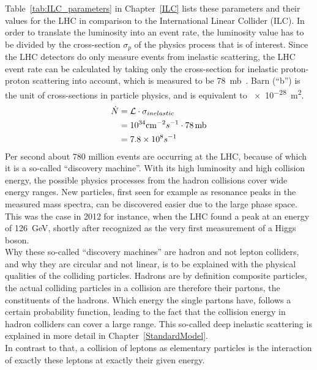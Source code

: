 Table~\ref{tab:ILC_parameters} in Chapter~\ref{ILC} lists these parameters and their values for the LHC in comparison to the International Linear Collider (ILC).
In order to translate the luminosity into an event rate, the luminosity value has to be divided by the cross-section $\sigma_p$ of the physics process that is of interest.
Since the LHC detectors do only measure events from inelastic scattering, the LHC event rate can be calculated by taking only the cross-section for inelastic proton-proton scattering into account, which is measured to be \SI{78}{\milli\barn}~\cite{inelXSection}. Barn (``b'') is the unit of cross-sections in particle physics, and is equivalent to \SI{e-28}{\meter\squared}.
\begin{align}
 \dot{N}&=\mathcal{L}\cdot\sigma_{inelastic}\\
 &=10^{34} \textrm{cm}^{-2}s^{-1} \cdot 78\textrm{\,mb}\\
 &=7.8\times 10^8 s^{-1}
\end{align}
Per second about 780 million events are occurring at the LHC, because of which it is a so-called ``discovery machine''.
With its high luminosity and high collision energy, the possible physics processes from the hadron collisions cover wide energy ranges.  
New particles, first seen for example as resonance peaks in the measured mass spectra, can be discovered easier due to the large phase space.
This was the case in 2012 for instance, when the LHC found a peak at an energy of \SI{126}{\GeV}, shortly after recognized as the very first measurement of a Higgs boson.~\cite{Higgs}\\
Why these so-called ``discovery machines'' are hadron and not lepton colliders, and why they are circular and not linear, is to be explained with the physical qualities of the colliding particles.
Hadrons are by definition composite particles, the actual colliding particles in a collision are therefore their partons, the constituents of the hadrons.
Which energy the single partons have, follows a certain probability function, leading to the fact that the collision energy in hadron colliders can cover a large range.
This so-called deep inelastic scattering is explained in more detail in Chapter~\ref{StandardModel}.\\
In contrast to that, a collision of leptons as elementary particles is the interaction of exactly these leptons at exactly their given energy.
